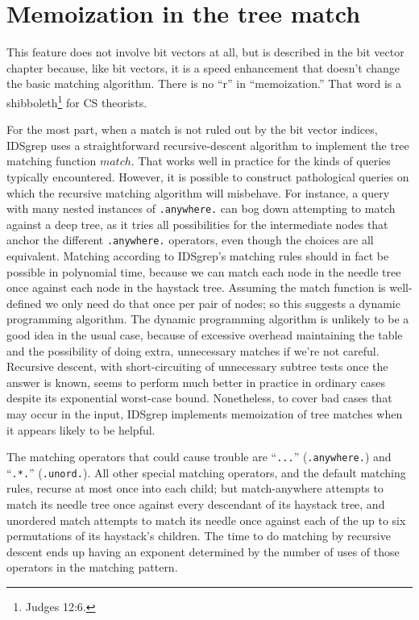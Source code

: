 \documentclass[twocolumn]{report}
\newcommand{\DangerousSection}{\marginpar{\large\hfill
\raisebox{-0.5\baselineskip}[0pt][0pt]{\dbend}\hfill\null}}
\begin{document}

\section{Memoization in the tree match}\DangerousSection

This feature does not involve bit vectors at all, but is described in the bit
vector chapter because, like bit vectors, it is a speed enhancement that
doesn't change the basic matching algorithm.  There is no ``r'' in
``memoization.'' That word is a shibboleth\footnote{Judges 12:6.} for CS
theorists.

For the most part, when a match is not ruled out by the bit vector indices,
IDSgrep uses a straightforward recursive-descent algorithm to implement the
tree matching function $\mathit{match}$.  That works well in practice for
the kinds of queries typically encountered.  However, it is possible to
construct pathological queries on which the recursive matching algorithm
will misbehave.  For instance, a query with many nested instances of
\texttt{.anywhere.} can bog down attempting to match against a deep tree, as
it tries all possibilities for the intermediate nodes that anchor the
different \texttt{.anywhere.} operators, even though the choices are all
equivalent.
Matching according to IDSgrep's matching rules should in fact be possible in
polynomial time, because we can match each node in the needle tree once
against each node in the haystack tree.  Assuming the match function is
well-defined we only need do that once per pair of nodes; so this suggests a
dynamic programming algorithm.  The dynamic programming algorithm is
unlikely to be a good idea in the usual case, because of excessive overhead
maintaining the table and the possibility of doing extra, unnecessary
matches if we're not careful.  Recursive descent, with short-circuiting of
unnecessary subtree tests once the answer is known, seems to perform much
better in practice in ordinary cases despite its exponential worst-case
bound.  Nonetheless, to cover bad cases that may occur in the input,
IDSgrep implements memoization of tree matches when it appears likely to be
helpful.

The matching operators that could cause trouble are ``\texttt{...}''
(\texttt{.anywhere.}) and ``\texttt{.*.}'' (\texttt{.unord.}).  All other
special matching operators, and the default matching rules, recurse at most
once into each child; but match-anywhere attempts to match its needle tree
once against every descendant of its haystack tree, and unordered match
attempts to match its needle once against each of the up to six permutations
of its haystack's children.  The time to do matching by recursive descent
ends up having an exponent determined by the number of uses of those
operators in the matching pattern.
\end{document}
